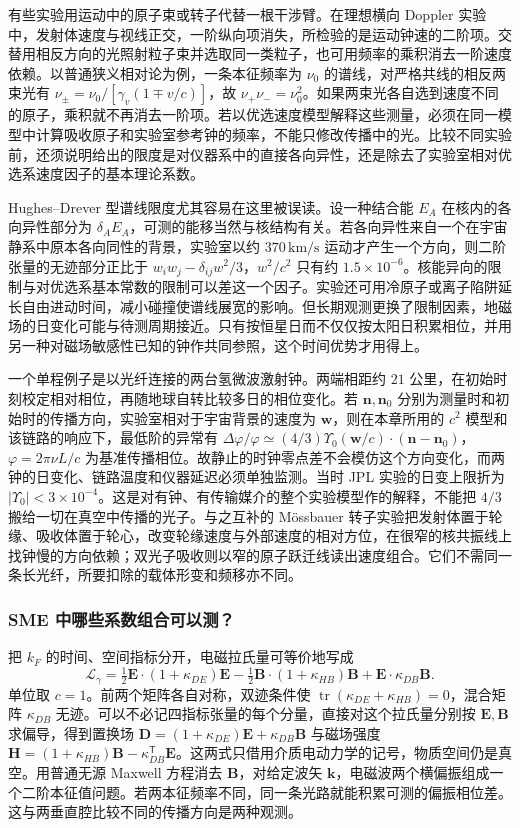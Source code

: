 有些实验用运动中的原子束或转子代替一根干涉臂。在理想横向 Doppler 实验中，发射体速度与视线正交，一阶纵向项消失，所检验的是运动钟速的二阶项。交替用相反方向的光照射粒子束并选取同一类粒子，也可用频率的乘积消去一阶速度依赖。以普通狭义相对论为例，一条本征频率为 $\nu_0$ 的谱线，对严格共线的相反两束光有 $\nu_\pm=\nu_0/[\gamma_v(1\mp v/c)]$，故 $\nu_+\nu_-=\nu_0^2$。如果两束光各自选到速度不同的原子，乘积就不再消去一阶项。若以优选速度模型解释这些测量，必须在同一模型中计算吸收原子和实验室参考钟的频率，不能只修改传播中的光。比较不同实验前，还须说明给出的限度是对仪器系中的直接各向异性，还是除去了实验室相对优选系速度因子的基本理论系数。

Hughes--Drever 型谱线限度尤其容易在这里被误读。设一种结合能 $E_A$ 在核内的各向异性部分为 $\delta_A E_A$，可测的能移当然与核结构有关。若各向异性来自一个在宇宙静系中原本各向同性的背景，实验室以约 $370\,\mathrm{km/s}$ 运动才产生一个方向，则二阶张量的无迹部分正比于 $w_iw_j-\delta_{ij}w^2/3$，$w^2/c^2$ 只有约 $1.5\times10^{-6}$。核能异向的限制与对优选系基本常数的限制可以差这一个因子。实验还可用冷原子或离子陷阱延长自由进动时间，减小碰撞使谱线展宽的影响。但长期观测更换了限制因素，地磁场的日变化可能与待测周期接近。只有按恒星日而不仅仅按太阳日积累相位，并用另一种对磁场敏感性已知的钟作共同参照，这个时间优势才用得上。

一个单程例子是以光纤连接的两台氢微波激射钟。两端相距约 $21$ 公里，在初始时刻校定相对相位，再随地球自转比较多日的相位变化。若 $\bm n,\bm n_0$ 分别为测量时和初始时的传播方向，实验室相对于宇宙背景的速度为 $\bm w$，则在本章所用的 $c^2$ 模型和该链路的响应下，最低阶的异常有 $\Delta\varphi/\varphi\simeq(4/3)\Upsilon_0(\bm w/c)\cdot(\bm n-\bm n_0)$，$\varphi=2\pi\nu L/c$ 为基准传播相位。故静止的时钟零点差不会模仿这个方向变化，而两钟的日变化、链路温度和仪器延迟必须单独监测。当时 JPL 实验的日变上限折为 $|\Upsilon_0|<3\times10^{-4}$。这是对有钟、有传输媒介的整个实验模型作的解释，不能把 $4/3$ 搬给一切在真空中传播的光子。与之互补的 Mössbauer 转子实验把发射体置于轮缘、吸收体置于轮心，改变轮缘速度与外部速度的相对方位，在很窄的核共振线上找钟慢的方向依赖；双光子吸收则以窄的原子跃迁线读出速度组合。它们不需同一条长光纤，所要扣除的载体形变和频移亦不同。

\subsubsection{SME 中哪些系数组合可以测？}

把 $k_F$ 的时间、空间指标分开，电磁拉氏量可等价地写成
\[
 \mathcal L_\gamma=\tfrac12\bm E\cdot(1+\kappa_{DE})\bm E
 -\tfrac12\bm B\cdot(1+\kappa_{HB})\bm B+\bm E\cdot\kappa_{DB}\bm B .
\]
单位取 $c=1$。前两个矩阵各自对称，双迹条件使 $\operatorname{tr}(\kappa_{DE}+\kappa_{HB})=0$，混合矩阵 $\kappa_{DB}$ 无迹。可以不必记四指标张量的每个分量，直接对这个拉氏量分别按 $\bm E,\bm B$ 求偏导，得到置换场 $\bm D=(1+\kappa_{DE})\bm E+\kappa_{DB}\bm B$ 与磁场强度 $\bm H=(1+\kappa_{HB})\bm B-\kappa_{DB}^{\mathsf T}\bm E$。这两式只借用介质电动力学的记号，物质空间仍是真空。用普通无源 Maxwell 方程消去 $\bm B$，对给定波矢 $\bm k$，电磁波两个横偏振组成一个二阶本征值问题。若两本征频率不同，同一条光路就能积累可测的偏振相位差。这与两垂直腔比较不同的传播方向是两种观测。

